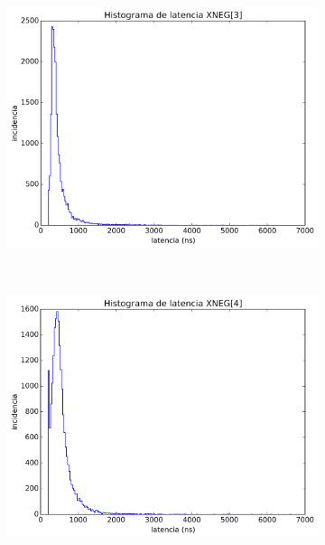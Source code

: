 \begin{figure}[ht!]
\begin{center}
\begin{subfigure}[b]{0.4\textwidth}
		    \caption{}
		    \label{fig:histograma_2}
	    \end{subfigure}
	    ~ %
	    \begin{subfigure}[b]{0.4\textwidth}
	    	\includegraphics[width=\textwidth]{figures/ch6_histograma_source_3.png}
		    \caption{}
		    \label{fig:histograma_3}
	    \end{subfigure}
	    ~ %
	    \begin{subfigure}[b]{0.4\textwidth}
	    	\includegraphics[width=\textwidth]{figures/ch6_histograma_source_4.png}

\end{subfigure}
\end{center}
\end{figure}
